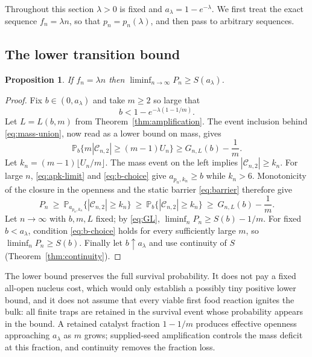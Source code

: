 \documentclass[11pt,reqno]{amsart}
\theoremstyle{plain}
\newtheorem{proposition}[theorem]{Proposition}
\theoremstyle{definition}
\theoremstyle{remark}
\numberwithin{equation}{section}
\newcommand{\Prob}{\mathbb{P}}
\newcommand{\cC}{\mathcal{C}}
\newcommand{\clam}{a_\lambda}
\begin{document}
Throughout this section $\lambda>0$ is fixed and $\clam=1-e^{-\lambda}$. We first treat the exact sequence $f_n=\lambda n$, so that $p_n=p_n(\lambda)$, and then pass to arbitrary sequences.

\subsection{The lower transition bound}

\begin{proposition}\label{prop:lower}
If $f_n=\lambda n$ then $\liminf_{n\to\infty}P_n\ge S(\clam)$.
\end{proposition}

\begin{proof}
Fix $b\in(0,\clam)$ and take $m\ge2$ so large that
\begin{equation}\label{eq:b-choice}
b<1-e^{-\lambda(1-1/m)} .
\end{equation}
Let $L=L(b,m)$ from Theorem~\ref{thm:amplification}. The event inclusion behind \eqref{eq:mass-union}, now read as a lower bound on mass, gives
\begin{equation}\label{eq:mass-lower}
\Prob_b\{m|\cC_{n,2}|\ge(m-1)U_n\}\ge G_{n,L}(b)-\frac1m .
\end{equation}
Let $k_n=(m-1)\lfloor U_n/m\rfloor$. The mass event on the left implies $|\cC_{n,2}|\ge k_n$. For large $n$, \eqref{eq:apk-limit} and \eqref{eq:b-choice} give $a_{p_n,k_n}\ge b$ while $k_n>6$. Monotonicity of the closure in the openness and the static barrier \eqref{eq:barrier} therefore give
\begin{equation}\label{eq:Pn-lower}
P_n\ \ge\ \Prob_{a_{p_n,k_n}}\{|\cC_{n,2}|\ge k_n\}\ \ge\ \Prob_b\{|\cC_{n,2}|\ge k_n\}\ \ge\ G_{n,L}(b)-\frac1m .
\end{equation}
Let $n\to\infty$ with $b,m,L$ fixed; by \eqref{eq:GL}, $\liminf_nP_n\ge S(b)-1/m$. For fixed $b<\clam$, condition \eqref{eq:b-choice} holds for every sufficiently large $m$, so $\liminf_nP_n\ge S(b)$. Finally let $b\uparrow\clam$ and use continuity of $S$ (Theorem~\ref{thm:continuity}).
\end{proof}

The lower bound preserves the full survival probability. It does not pay a fixed all-open nucleus cost, which would only establish a possibly tiny positive lower bound, and it does not assume that every viable first food reaction ignites the bulk: all finite traps are retained in the survival event whose probability appears in the bound. A retained catalyst fraction $1-1/m$ produces effective openness approaching $\clam$ as $m$ grows; supplied-seed amplification controls the mass deficit at this fraction, and continuity removes the fraction loss.
\end{document}
